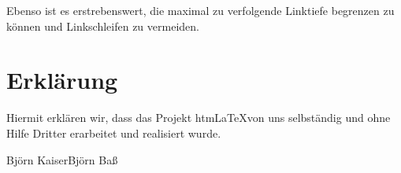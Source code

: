\documentclass[	a4paper,		%
		titlepage, 		%
		fontsize=12pt		%
		]{scrartcl} 		%
\begin{document}
Ebenso ist es erstrebenswert, die maximal zu verfolgende Linktiefe begrenzen zu können und Linkschleifen zu vermeiden.


% 
% 

\appendix

% 
\label{quellcode}
\newpage

\section{Erklärung}
Hiermit erklären wir, dass das Projekt htm\LaTeX von uns selbständig und ohne Hilfe Dritter erarbeitet und realisiert wurde.

\vspace{3cm}
\noindent
\hrulefill \hfill \hrulefill \newline
Björn Kaiser\hfill Björn Baß
\newpage
\newpage	%
\end{document}

